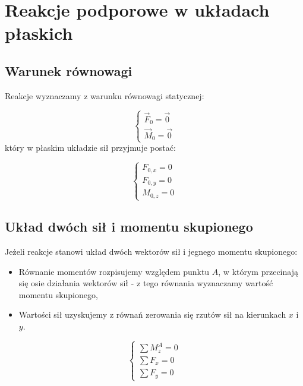 \section{Reakcje podporowe w układach płaskich}

\subsection*{Warunek równowagi}

Reakcje wyznaczamy z warunku równowagi statycznej:

\begin{equation}
    \begin{cases}
        \Vec{F}_0 = \Vec{0} \\
        \Vec{M}_0 = \Vec{0}
    \end{cases}
\end{equation}
który w płaskim układzie sił przyjmuje postać:

\begin{equation}
    \begin{cases}
        F_{0,x} = 0 \\
        F_{0,y} = 0 \\
        M_{0,z} = 0
    \end{cases}
\end{equation}

\subsection*{Układ dwóch sił i momentu skupionego}

Jeżeli reakcje stanowi układ dwóch wektorów sił i jegnego momentu skupionego:
\begin{itemize}
    \item Równanie momentów rozpisujemy względem punktu $A$, w którym przecinają się osie działania wektorów sił - z tego równania wyznaczamy wartość momentu skupionego,
    \item Wartości sił uzyskujemy z równań zerowania się rzutów sił na kierunkach $x$ i $y$.
\end{itemize}

\begin{equation}
    \begin{cases}
        \sum M_z^A = 0 \\
        \sum F_x = 0 \\
        \sum F_y = 0
    \end{cases}
\end{equation}

